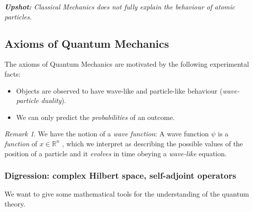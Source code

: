 \documentclass[11pt]{amsart}
\numberwithin{equation}{section}
\theoremstyle{plain}
\theoremstyle{definition}
\theoremstyle{remark}
\newtheorem{rem}{Remark}[subsection]
\newcommand{\R}{\mathbb{R}}
\begin{document}
\vspace{0.3cm}
\emph{{\bf Upshot:} Classical Mechanics does not fully explain the behaviour of atomic particles.}
\vspace{0.3cm}


\subsection{Axioms of Quantum Mechanics}
The axioms of Quantum Mechanics are motivated by the following experimental facts:
\begin{itemize}
\item{Objects are observed to have wave-like and particle-like behaviour (\emph{wave-particle duality}).
}
\item{We can only predict the \emph{probabilities} of an outcome.}
\end{itemize}

\begin{rem}
We have the notion of a \emph{wave function}: A wave function $\psi$ is a \emph{function} of $x\in\R^n$ , which we interpret as describing the possible values of the position of a particle and it \emph{evolves} in time obeying a \emph{wave-like} equation.
\end{rem}

\subsubsection{Digression: complex Hilbert space, self-adjoint operators} We want to give some mathematical tools for the understanding of the quantum theory. 
\end{document}
